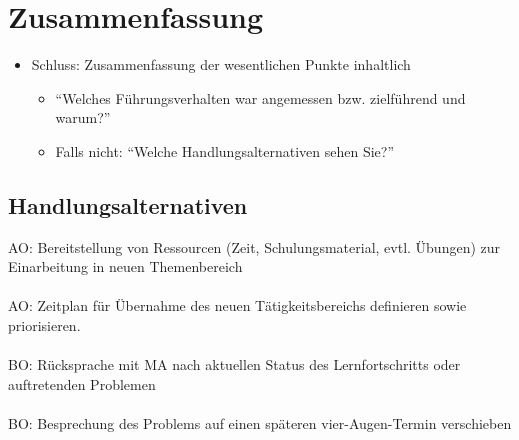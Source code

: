 \chapter{Zusammenfassung}
\label{chap:zusammenfassung}

\begin{itemize}
\item Schluss: Zusammenfassung der wesentlichen Punkte inhaltlich
\begin{itemize}
\item "`Welches Führungsverhalten war angemessen bzw. zielführend und warum?"'
\item Falls nicht: "`Welche Handlungsalternativen sehen Sie?"'
\end{itemize}
\end{itemize}

\section{Handlungsalternativen}
\ac{AO}: Bereitstellung von Ressourcen (Zeit, Schulungsmaterial, evtl. Übungen) zur Einarbeitung in neuen Themenbereich \\
\\
\ac{AO}: Zeitplan für Übernahme des neuen Tätigkeitsbereichs definieren sowie priorisieren.\\
\\
\ac{BO}: Rücksprache mit \ac{MA} nach aktuellen Status des Lernfortschritts oder 
auftretenden Problemen \\
\\
\ac{BO}: Besprechung des Problems auf einen späteren vier-Augen-Termin verschieben\\
\\

